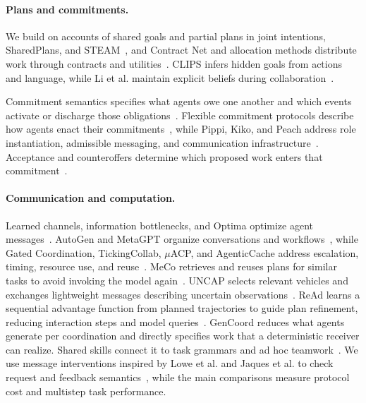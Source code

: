 \documentclass[sigconf,nonacm,balance=false]{aamas}
\begin{document}
\paragraph{Plans and commitments.}
We build on accounts of shared goals and partial plans in joint intentions, SharedPlans, and STEAM~\cite{cohen1991teamwork,grosz1996collaborative,tambe1997teamwork}, and Contract Net and allocation methods distribute work through contracts and utilities~\cite{smith1980contractnet,gerkey2004mrta,choi2009cbba}. CLIPS infers hidden goals from actions and language, while Li et al. maintain explicit beliefs during collaboration~\cite{aamas2024_p2094,li2023theory}. 

Commitment semantics specifies what agents owe one another and which events activate or discharge those obligations~\cite{singh1998acl,fornara2002operational,singh2008commitments}. Flexible commitment protocols describe how agents enact their commitments~\cite{yolum2002flexible}, while Pippi, Kiko, and Peach address role instantiation, admissible messaging, and communication infrastructure~\cite{aamas2022_p281,aamas2023_p1154,aamas2026_SAXY3841}. Acceptance and counteroffers determine which proposed work enters that commitment~\cite{jennings2001negotiation}.

\paragraph{Communication and computation.}
Learned channels, information bottlenecks, and Optima optimize agent messages~\cite{foerster2016dial,sukhbaatar2016commnet,wang2020imac,chen2024optima}. AutoGen and MetaGPT organize conversations and workflows~\cite{wu2023autogen,hong2024metagpt}, while Gated Coordination, TickingCollab, $\mu$ACP, and AgenticCache address escalation, timing, resource use, and reuse~\cite{jian2026gated,yi2026ticking,aamas2026_PHRW6922,kim2026agenticcache}. MeCo retrieves and reuses plans for similar tasks to avoid invoking the model again~\cite{aamas2026_QPUC1624}. UNCAP selects relevant vehicles and exchanges lightweight messages describing uncertain observations~\cite{aamas2026_WHRE3513}. ReAd learns a sequential advantage function from planned trajectories to guide plan refinement, reducing interaction steps and model queries~\cite{zhang2025read}. GenCoord reduces what agents generate per coordination and directly specifies work that a deterministic receiver can realize. Shared skills connect it to task grammars and ad hoc teamwork~\cite{aamas2024_p544,stone2010adhoc}. We use message interventions inspired by Lowe et al. and Jaques et al. to check request and feedback semantics~\cite{lowe2019pitfalls,jaques2019social}, while the main comparisons measure protocol cost and multistep task performance.
\end{document}

